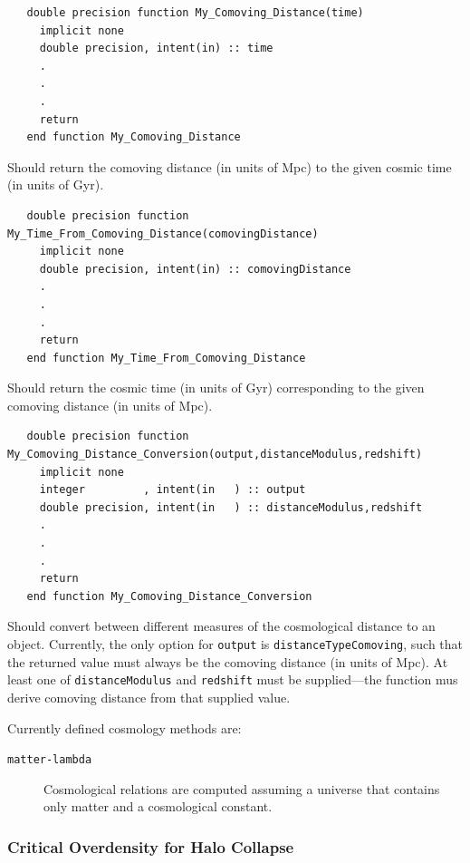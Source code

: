 \begin{verbatim}
   double precision function My_Comoving_Distance(time)
     implicit none
     double precision, intent(in) :: time
     .
     .
     .
     return
   end function My_Comoving_Distance
\end{verbatim}
Should return the comoving distance (in units of Mpc) to the given cosmic time (in units of Gyr).

\begin{verbatim}
   double precision function My_Time_From_Comoving_Distance(comovingDistance)
     implicit none
     double precision, intent(in) :: comovingDistance
     .
     .
     .
     return
   end function My_Time_From_Comoving_Distance
\end{verbatim}
Should return the cosmic time (in units of Gyr) corresponding to the given comoving distance (in units of Mpc).

\begin{verbatim}
   double precision function My_Comoving_Distance_Conversion(output,distanceModulus,redshift)
     implicit none
     integer         , intent(in   ) :: output
     double precision, intent(in   ) :: distanceModulus,redshift
     .
     .
     .
     return
   end function My_Comoving_Distance_Conversion
\end{verbatim}
Should convert between different measures of the cosmological distance to an object. Currently, the only option for {\tt output} is {\tt distanceTypeComoving}, such that the returned value must always be the comoving distance (in units of Mpc). At least one of {\tt distanceModulus} and {\tt redshift} must be supplied---the function mus derive comoving distance from that supplied value.

Currently defined cosmology methods are:
\begin{description}
 \item [{\tt matter-lambda}] Cosmological relations are computed assuming a universe that contains only matter and a cosmological constant.
\end{description}

\subsubsection{Critical Overdensity for Halo Collapse}

